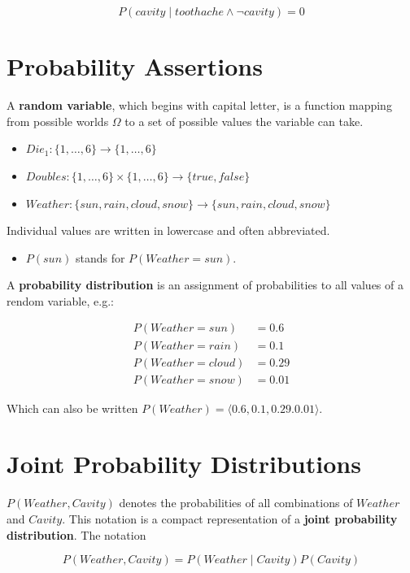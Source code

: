 \documentclass[11pt]{article}
\begin{document}
\begin{equation*}
P(cavity \mid toothache \land \neg cavity) = 0
\end{equation*}
\section{Probability Assertions}
\label{sec:org8c2060e}


A \textbf{random variable}, which begins with capital letter, is a function mapping from possible worlds \(\Omega\) to a set of possible values the variable can take.

\begin{itemize}
\item \(Die_1: \{1, \dots, 6\} \to \{1, \dots, 6\}\)
\item \(Doubles: \{1, \dots, 6\} \times \{1, \dots, 6\} \to \{true, false\}\)
\item \(Weather: \{sun,rain,cloud,snow\} \to \{sun,rain,cloud,snow\}\)
\end{itemize}

Individual values are written in lowercase and often abbreviated.

\begin{itemize}
\item \(P(sun)\) stands for \(P(Weather=sun)\).
\end{itemize}

A \textbf{probability distribution} is an assignment of probabilities to all values of a rendom variable, e.g.:

\begin{align*}
P(Weather=sun)   &= 0.6 \\
P(Weather=rain)  &= 0.1 \\
P(Weather=cloud) &= 0.29 \\
P(Weather=snow)  &= 0.01
\end{align*}

Which can also be written \(P(Weather) = \langle 0.6, 0.1, 0.29. 0.01 \rangle\).
\section{Joint Probability Distributions}
\label{sec:org7c26b2d}

\(P(Weather, Cavity)\) denotes the probabilities of all combinations of \(Weather\) and \(Cavity\).  This notation is a compact representation of a \textbf{joint probability distribution}.  The notation

\begin{equation*}
P(Weather, Cavity) = P(Weather  \mid  Cavity) P(Cavity)
\end{equation*}
\end{document}

